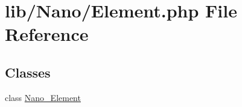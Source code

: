 \hypertarget{Element_8php}{
\section{lib/Nano/Element.php File Reference}
\label{Element_8php}
}
\subsection*{Classes}
\begin{CompactItemize}
\item 
class \hyperlink{classNano__Element}{Nano\_\-Element}
\end{CompactItemize}
